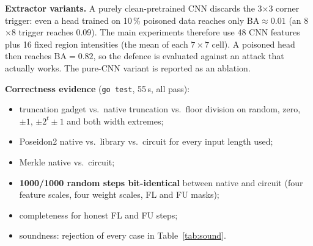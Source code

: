 \documentclass[conference]{IEEEtran}
\newcommand{\BA}{\textrm{BA}}
\newcommand{\code}[1]{\texttt{\small #1}}
\begin{document}
\textbf{Extractor variants.} A purely clean-pretrained CNN discards the 3$\times$3 corner trigger:
even a head trained on 10\,\% poisoned data reaches only $\BA\approx0.01$ (an 8$\times$8 trigger
reaches 0.09). The main experiments therefore use 48 CNN features plus 16 fixed region intensities
(the mean of each $7\times7$ cell). A poisoned head then reaches $\BA=0.82$, so the defence is
evaluated against an attack that actually works. The pure-CNN variant is reported as an ablation.

\textbf{Correctness evidence} (\code{go test}, 55\,s, all pass):
\begin{itemize}
\item truncation gadget vs.\ native truncation vs.\ floor division on random, zero, $\pm1$,
$\pm2^t\pm1$ and both width extremes;
\item Poseidon2 native vs.\ library vs.\ circuit for every input length used;
\item Merkle native vs.\ circuit;
\item \textbf{1000/1000 random steps bit-identical} between native and circuit (four feature
scales, four weight scales, FL and FU masks);
\item completeness for honest FL and FU steps;
\item soundness: rejection of every case in Table~\ref{tab:sound}.
\end{itemize}

\begin{table}[t]
\centering\footnotesize\caption{Soundness tests: every manipulation is rejected.}\label{tab:sound}
\setlength{\tabcolsep}{3pt}
\end{table}
\end{document}
